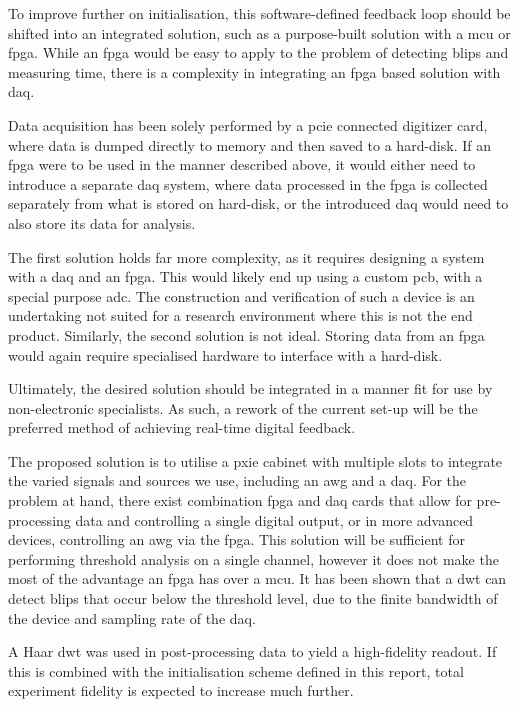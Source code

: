 To improve further on initialisation, this software-defined feedback loop should be shifted into an integrated solution, such as a purpose-built solution with a \gls{mcu} or \gls{fpga}. While an \gls{fpga} would be easy to apply to the problem of detecting blips and measuring time, there is a complexity in integrating an \gls{fpga} based solution with \gls{daq}. 

Data acquisition has been solely performed by a \gls{pcie} connected digitizer card, where data is dumped directly to memory and then saved to a hard-disk. If an \gls{fpga} were to be used in the manner described above, it would either need to introduce a separate \gls{daq} system, where data processed in the \gls{fpga} is collected separately from what is stored on hard-disk, or the introduced \gls{daq} would need to also store its data for analysis.

The first solution holds far more complexity, as it requires designing a system with a \gls{daq} and an \gls{fpga}. This would likely end up using a custom \gls{pcb}, with a special purpose \gls{adc}. The construction and verification of such a device is an undertaking not suited for a research environment where this is not the end product. Similarly, the second solution is not ideal. Storing data from an \gls{fpga} would again require specialised hardware to interface with a hard-disk. 


Ultimately, the desired solution should be integrated in a manner fit for use by non-electronic specialists. As such, a rework of the current set-up will be the preferred method of achieving real-time digital feedback.

The proposed solution is to utilise a \gls{pxie} cabinet with multiple slots to integrate the varied signals and sources we use, including an \gls{awg} and a \gls{daq}. For the problem at hand, there exist combination \gls{fpga} and \gls{daq} cards that allow for pre-processing data and controlling a single digital output, or in more advanced devices, controlling an \gls{awg} via the \gls{fpga}. This solution will be sufficient for performing threshold analysis on a single channel, however it does not make the most of the advantage an \gls{fpga} has over a \gls{mcu}. It has been shown  that a \gls{dwt} can detect blips that occur below the threshold level, due to the finite bandwidth of the device and sampling rate of the \gls{daq}.

A Haar \gls{dwt} was used in post-processing data to yield a high-fidelity readout. If this is combined with the initialisation scheme defined in this report, total experiment fidelity is expected to increase much further.

